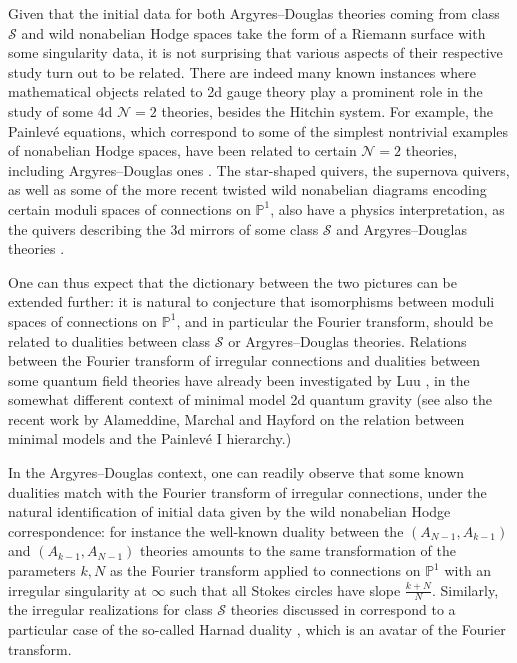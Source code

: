 \documentclass[11pt,a4paper]{amsart}
\numberwithin{equation}{section}
\begin{document}
Given that the initial data for both Argyres--Douglas theories coming from class $\mathcal S$ and wild nonabelian Hodge spaces take the form  of a Riemann surface with some singularity data, it is not surprising that various aspects of their respective study turn out to be related. There are indeed many known instances where mathematical objects related to 2d gauge theory play a prominent role in the study of some 4d $\mathcal N=2$ theories, besides the Hitchin system. For example, the Painlevé equations, which correspond to some of the simplest nontrivial examples of nonabelian Hodge spaces, have been related to certain $\mathcal N=2$ theories, including Argyres--Douglas ones \cite{bonelli2017painleve,bonelli2025refined, grassi2019argyres}. 
The star-shaped quivers, the supernova quivers, as well as some of the more recent twisted wild nonabelian diagrams encoding certain moduli spaces of connections on $\mathbb P^1$, also have a physics interpretation, as the quivers describing the 3d mirrors of some class $\mathcal S$ and Argyres--Douglas theories \cite{benini2010mirrors,xie2013general, delzotto2015complete,xie20213d}. 

One can thus expect that the dictionary between the two pictures can be extended further: it is natural to conjecture that isomorphisms between moduli spaces of connections on $\mathbb P^1$, and in particular the Fourier transform, should be related to dualities between class $\mathcal S$ or Argyres--Douglas theories. Relations between the Fourier transform of irregular connections and dualities between some quantum field theories have already been investigated by Luu \cite{luu2015duality,luu2016fourier}, in the somewhat different context of minimal model 2d quantum gravity (see also the recent work by Alameddine, Marchal and Hayford \cite{alameddine2025painleve} on the relation between minimal models and the Painlevé I hierarchy.) 


In the Argyres--Douglas context, one can readily observe that some known dualities match with the Fourier transform of irregular connections, under the natural identification of initial data given by the wild nonabelian Hodge correspondence: for instance the well-known duality between the $(A_{N-1}, A_{k-1})$ and $(A_{k-1}, A_{N-1})$  theories \cite{cecotti2010r-twisting} amounts to the same transformation of the parameters $k,N$ as the Fourier transform applied to connections on $\mathbb P^1$ with an irregular singularity at $\infty$ such that all Stokes circles have slope $\frac{k+N}{N}$. Similarly, the irregular realizations for class $\mathcal S$ theories discussed in \cite[§6.3.1]{xie2013general} correspond to a particular case of the so-called Harnad duality \cite{adams1990dual, harnad1994dual,yamakawa2011middle}, which is an avatar of the Fourier transform.
\end{document}
